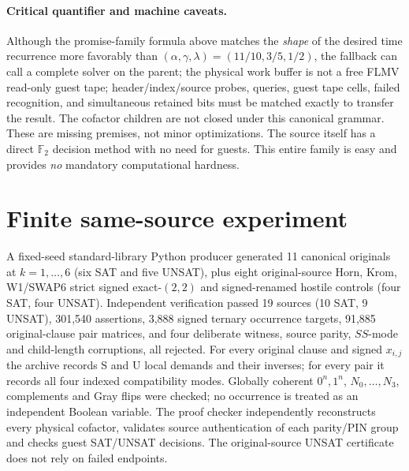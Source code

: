 \documentclass[11pt]{article}
\begin{document}
\paragraph{Critical quantifier and machine caveats.} Although the promise-family formula above matches the \emph{shape} of the desired time recurrence more favorably than $(\alpha,\gamma,\lambda)=(11/10,3/5,1/2)$, the fallback can call a complete solver on the parent; the physical work buffer is not a free FLMV read-only guest tape; header/index/source probes, queries, guest tape cells, failed recognition, and simultaneous retained bits must be matched exactly to transfer the result. The cofactor children are not closed under this canonical grammar. These are missing premises, not minor optimizations. The source itself has a direct $\mathbb F_2$ decision method with no need for guests. This entire family is easy and provides \emph{no} mandatory computational hardness.

\section{Finite same-source experiment}
A fixed-seed standard-library Python producer generated 11 canonical originals at $k=1,\ldots,6$ (six SAT and five UNSAT), plus eight original-source Horn, Krom, W1/SWAP6 strict signed exact-$(2,2)$ and signed-renamed hostile controls (four SAT, four UNSAT). Independent verification passed 19 sources (10 SAT, 9 UNSAT), 301,540 assertions, 3,888 signed ternary occurrence targets, 91,885 original-clause pair matrices, and four deliberate witness, source parity, $SS$-mode and child-length corruptions, all rejected. For every original clause and signed $x_{i,j}$ the archive records S and U local demands and their inverses; for every pair it records all four indexed compatibility modes. Globally coherent $0^n,1^n$, $N_0,\ldots,N_3$, complements and Gray flips were checked; no occurrence is treated as an independent Boolean variable. The proof checker independently reconstructs every physical cofactor, validates source authentication of each parity/PIN group and checks guest SAT/UNSAT decisions. The original-source UNSAT certificate does not rely on failed endpoints.
\end{document}
